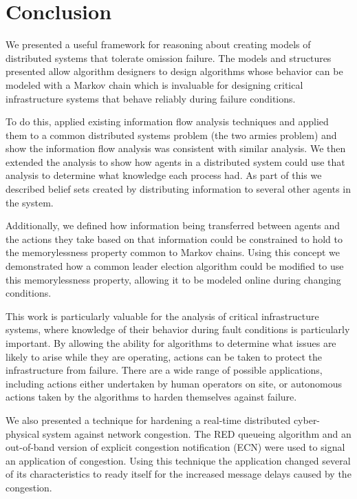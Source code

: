 
\chapter{Conclusion}

We presented a useful framework for reasoning about creating models of distributed systems that tolerate omission failure.
The models and structures presented allow algorithm designers to design algorithms whose behavior can be modeled with a Markov chain which is invaluable for designing critical infrastructure systems that behave reliably during failure conditions.

To do this, applied existing information flow analysis techniques and applied them to a common distributed systems problem (the two armies problem) and show the information flow analysis was consistent with similar analysis.
We then extended the analysis to show how agents in a distributed system could use that analysis to determine what knowledge each process had.
As part of this we described belief sets created by distributing information to several other agents in the system.

Additionally, we defined how information being transferred between agents and the actions they take based on that information could be constrained to hold to the memorylessness property common to Markov chains.
Using this concept we demonstrated how a common leader election algorithm could be modified to use this memorylessness property, allowing it to be modeled online during changing conditions.

This work is particularly valuable for the analysis of critical infrastructure systems, where knowledge of their behavior during fault conditions is particularly important.
By allowing the ability for algorithms to determine what issues are likely to arise while they are operating, actions can be taken to protect the infrastructure from failure.
There are a wide range of possible applications, including actions either undertaken by human operators on site, or autonomous actions taken by the algorithms to harden themselves against failure.

We also presented a technique for hardening a real-time distributed cyber-physical system against network congestion.
The \ac{RED} queueing algorithm and an out-of-band version of explicit congestion notification (ECN) were used to signal an application of congestion.
Using this technique the application changed several of its characteristics to ready itself for the increased message delays caused by the congestion.


